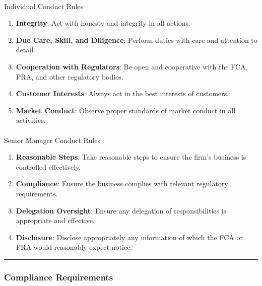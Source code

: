 \documentclass[
  a4paper,
]{article}
\makeatletter
\let\oldparagraph\paragraph
\renewcommand{\paragraph}{
    \@ifstar
      \xxxParagraphStar
      \xxxParagraphNoStar
  }
\newcommand{\xxxParagraphStar}[1]{\oldparagraph*{#1}\mbox{}}
\newcommand{\xxxParagraphNoStar}[1]{\oldparagraph{#1}\mbox{}}
\providecommand{\tightlist}{%
  \setlength{\itemsep}{0pt}\setlength{\parskip}{0pt}}\usepackage{longtable,booktabs,array}
\makeatother
\begin{document}
\paragraph{Individual Conduct Rules}\label{individual-conduct-rules}

\begin{enumerate}
\def\labelenumi{\arabic{enumi}.}
\tightlist
\item
  \textbf{Integrity}: Act with honesty and integrity in all actions.
\item
  \textbf{Due Care, Skill, and Diligence}: Perform duties with care and
  attention to detail.
\item
  \textbf{Cooperation with Regulators}: Be open and cooperative with the
  FCA, PRA, and other regulatory bodies.
\item
  \textbf{Customer Interests}: Always act in the best interests of
  customers.
\item
  \textbf{Market Conduct}: Observe proper standards of market conduct in
  all activities.
\end{enumerate}

\paragraph{Senior Manager Conduct
Rules}\label{senior-manager-conduct-rules}

\begin{enumerate}
\def\labelenumi{\arabic{enumi}.}
\tightlist
\item
  \textbf{Reasonable Steps}: Take reasonable steps to ensure the firm's
  business is controlled effectively.
\item
  \textbf{Compliance}: Ensure the business complies with relevant
  regulatory requirements.
\item
  \textbf{Delegation Oversight}: Ensure any delegation of
  responsibilities is appropriate and effective.
\item
  \textbf{Disclosure}: Disclose appropriately any information of which
  the FCA or PRA would reasonably expect notice.
\end{enumerate}

\begin{center}\rule{0.5\linewidth}{0.5pt}\end{center}

\subsubsection{Compliance Requirements}\label{compliance-requirements}
\end{document}
